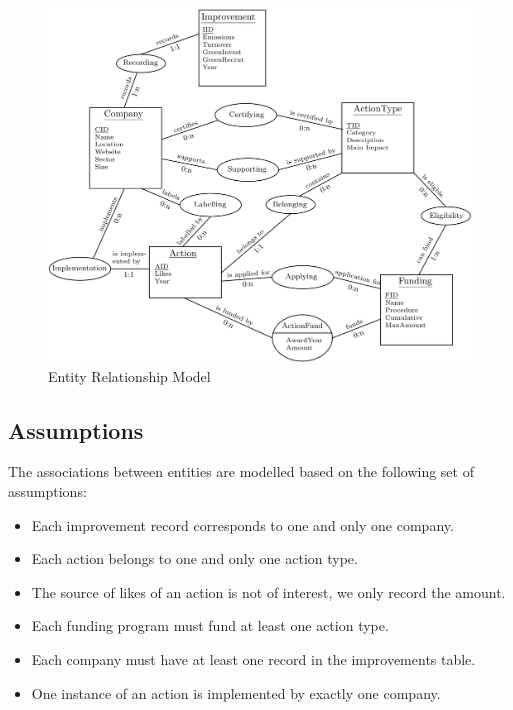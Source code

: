 \begin{figure}
    \caption{Entity Relationship Model}
    \label{fig:ER}
    \includegraphics[width=16cm]{ER_model.png}
\end{figure}


\clearpage
\subsection{Assumptions} \label{sec:assumptions}
The associations between entities are modelled based on the following set of assumptions:
\begin{itemize}
    \item Each improvement record corresponds to one and only one company.
    \item Each action belongs to one and only one action type.
    \item The source of likes of an action is not of interest, we only record the amount.
    \item Each funding program must fund at least one action type.
    \item Each company must have at least one record in the improvements table.
    \item One instance of an action is implemented by exactly one company.
\end{itemize}

